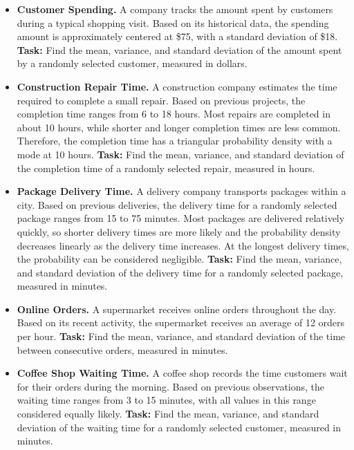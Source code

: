	\begin{itemize}
		

		\item \textbf{Customer Spending.}
		A company tracks the amount spent by customers during a typical
		shopping visit. Based on its historical data, the spending amount is
		approximately centered at \$75, with a standard deviation of \$18.
		\textbf{Task:} Find the mean, variance, and standard deviation of the amount spent by a randomly selected customer,
		measured in dollars.
		
		\item \textbf{Construction Repair Time.}
		A construction company estimates the time required to complete a small
		repair. Based on previous projects, the completion time ranges from
		6 to 18 hours. Most repairs are completed in about 10 hours, while
		shorter and longer completion times are less common. Therefore, the
		completion time has a triangular probability density with a mode at
		10 hours.
		\textbf{Task:} Find the mean, variance, and standard deviation of the completion time of a randomly selected repair,
		measured in hours.
		
		\item \textbf{Package Delivery Time.}
		A delivery company transports packages within a city. Based on previous
		deliveries, the delivery time for a randomly selected package ranges
		from 15 to 75 minutes. Most packages are delivered relatively quickly,
		so shorter delivery times are more likely and the probability density
		decreases linearly as the delivery time increases. At the longest
		delivery times, the probability can be considered negligible.
		\textbf{Task:} Find the mean, variance, and standard deviation of the delivery time for a randomly selected package,
		measured in minutes.
		
		\item \textbf{Online Orders.}
		A supermarket receives online orders throughout the day. Based on its
		recent activity, the supermarket receives an average of 12 orders per
		hour.
		\textbf{Task:} Find the mean, variance, and standard deviation of the time between consecutive orders,
		measured in minutes.
		
		\item \textbf{Coffee Shop Waiting Time.}
		A coffee shop records the time customers wait for their orders during
		the morning. Based on previous observations, the waiting time ranges
		from 3 to 15 minutes, with all values in this range considered equally
		likely.
		\textbf{Task:} Find the mean, variance, and standard deviation of the waiting time for a randomly selected customer,
		measured in minutes.
		

\end{itemize}
